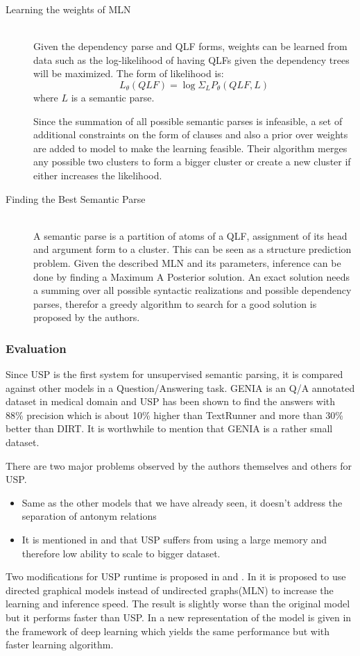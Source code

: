 \begin{description}
  \item[Learning the weights of MLN] \hfill \\
  Given the dependency parse and QLF forms, weights can be learned from data such as the log-likelihood
  of having QLFs given the dependency trees will be maximized. The form of likelihood is:
  $$ L_{\theta}(QLF) = \log{\Sigma_L{P_\theta{(QLF, L)}}}$$ where $L$ is a semantic parse.
  
  Since the summation of all possible semantic parses is infeasible, a set of additional constraints on the form
  of clauses and also a prior over weights are added to model to make the learning feasible. Their algorithm
  merges any possible two clusters to form a bigger cluster or create a new cluster if either increases the likelihood.
  \item[Finding the Best Semantic Parse] \hfill \\
  A semantic parse is a partition of atoms of a QLF, assignment of its head and argument form to a cluster. 
  This can be seen as a structure prediction problem. Given the described MLN and its parameters, inference can
   be done by finding a Maximum A Posterior solution. An exact solution needs a summing over all possible syntactic realizations and
   possible dependency parses, therefor a greedy algorithm to search for a good solution is proposed 
   by the authors.   
\end{description}

\subsubsection {Evaluation}
\label{ssec:usp-eval}
Since USP is the first system for unsupervised semantic parsing, it is compared against other models in a Question/Answering task.
GENIA is an Q/A annotated dataset in medical domain and USP has been shown to find the answers with 88\% precision
which is about 10\% higher than TextRunner and more than 30\% better than DIRT. It is worthwhile to mention that
GENIA is a rather small dataset.

There are two major problems observed by the authors themselves and others for USP.
\begin{itemize}
 \item Same as the other models that we have already seen,
 it doesn't address the separation of antonym relations
 \item It is mentioned in \cite{Yao2011} and \cite{Titov2011}
  that USP suffers from using a large memory and therefore low ability to scale to bigger dataset. 
 \end{itemize}
 Two modifications for USP runtime is proposed in \cite{Poon2013} and \cite{Titov2011}.
  In \cite{Titov2011}
   it is proposed to use directed graphical models instead of undirected graphs(MLN) to increase the learning and inference speed.
  The result is slightly worse than the original model but it performs faster than USP.
  In \cite{Poon2013} 
  a new representation of the model is given in the framework of deep learning which yields 
  the same performance but with faster learning algorithm.
  
